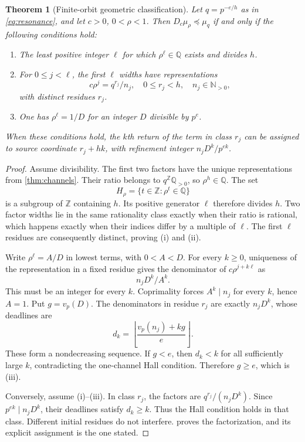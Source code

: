 \documentclass[11pt,letterpaper]{article}
\newtheorem{theorem}{Theorem}[section]
\theoremstyle{definition}
\theoremstyle{remark}
\newcommand{\Np}{\mathbb N_{>0}}
\newcommand{\Q}{\mathbb Q}
\newcommand{\Z}{\mathbb Z}
\numberwithin{equation}{section}
\begin{document}
\begin{theorem}[Finite-orbit geometric classification]\label{thm:orbit}
Let $q=p^{-e/h}$ as in \eqref{eq:resonance}, and let $c>0$, $0<\rho<1$. Then $D_c\mu_\rho\preceq\mu_q$ if and only if the following conditions hold:
\begin{enumerate}[label=(\roman*),nosep]
\item The least positive integer $\ell$ for which $\rho^\ell\in\Q$ exists and divides $h$.
\item For $0\le j<\ell$, the first $\ell$ widths have representations
\begin{equation}\label{eq:orbit-first}
 c\rho^j=q^{r_j}/n_j,
 \quad 0\le r_j<h,\quad n_j\in\Np,
\end{equation}
with distinct residues $r_j$.
\item One has $\rho^\ell=1/D$ for an integer $D$ divisible by $p^e$.
\end{enumerate}
When these conditions hold, the $k$th return of the term in class $r_j$ can be assigned to source coordinate $r_j+hk$, with refinement integer $n_jD^k/p^{ek}$.
\end{theorem}
\begin{proof}
Assume divisibility. The first two factors have the unique representations from \cref{thm:channels}. Their ratio belongs to $q^\Z\Q_{>0}$, so $\rho^h\in\Q$. The set
\[
 H_\rho=\{t\in\Z:\rho^t\in\Q\}
\]
is a subgroup of $\Z$ containing $h$. Its positive generator $\ell$ therefore divides $h$. Two factor widths lie in the same rationality class exactly when their ratio is rational, which happens exactly when their indices differ by a multiple of $\ell$. The first $\ell$ residues are consequently distinct, proving (i) and (ii).

Write $\rho^\ell=A/D$ in lowest terms, with $0<A<D$. For every $k\ge0$, uniqueness of the representation in a fixed residue gives the denominator of $c\rho^{j+k\ell}$ as
\[
 n_jD^k/A^k.
\]
This must be an integer for every $k$. Coprimality forces $A^k\mid n_j$ for every $k$, hence $A=1$. Put $g=v_p(D)$. The denominators in residue $r_j$ are exactly $n_jD^k$, whose deadlines are
\[
 d_k=\left\lfloor\frac{v_p(n_j)+kg}{e}\right\rfloor.
\]
These form a nondecreasing sequence. If $g<e$, then $d_k<k$ for all sufficiently large $k$, contradicting the one-channel Hall condition. Therefore $g\ge e$, which is (iii).

Conversely, assume (i)--(iii). In class $r_j$, the factors are $q^{r_j}/(n_jD^k)$. Since $p^{ek}\mid n_jD^k$, their deadlines satisfy $d_k\ge k$. Thus the Hall condition holds in that class. Different initial residues do not interfere.  proves the factorization, and its explicit assignment is the one stated.
\end{proof}
\end{document}
